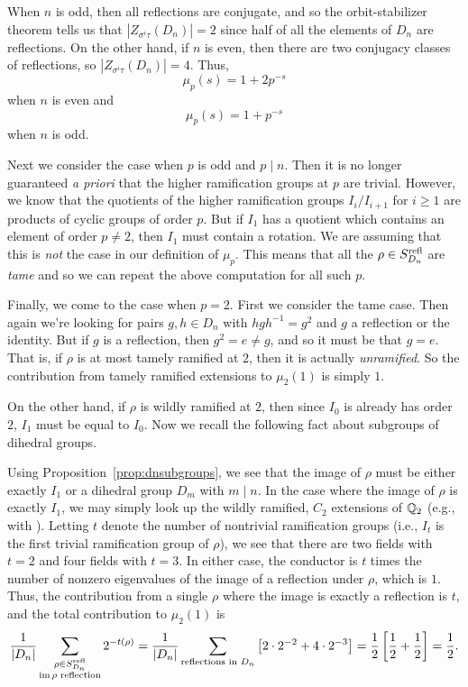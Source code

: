 When $n$ is odd, then all reflections are conjugate, and so the
orbit-stabilizer theorem tells us that $|Z_{\sigma^i\tau}(D_n)| = 2$ since half
of all the elements of $D_n$ are reflections. On the other hand, if $n$ is
even, then there are two conjugacy classes of reflections, so $|Z_{\sigma^i\tau}(D_n)| = 4$. Thus,
\[ \mu_p(s) = 1 + 2p^{-s} \]
when $n$ is even and
\[ \mu_p(s) = 1 + p^{-s} \]
when $n$ is odd.

Next we consider the case when $p$ is odd and $p \mid n$. Then it is no longer
guaranteed {\em a priori} that the higher ramification groups at $p$ are
trivial. However, we know that the quotients of the higher ramification groups
$I_i/I_{i+1}$ for $i \geq 1$ are products of cyclic groups of order $p$. But if
$I_1$ has a quotient which contains an element of order $p \ne 2$, then $I_1$
must contain a rotation. We are assuming that this is {\em not} the case in our
definition of $\mu_p$. This means that all the $\rho \in S_{D_n}^{\mathrm{refl}}$ are
{\em tame} and so we can repeat the above computation for all such $p$.

Finally, we come to the case when $p = 2$. First we consider the tame case.
Then again we're looking for pairs $g, h \in D_n$ with $hgh^{-1} = g^2$ and $g$
a reflection or the identity. But if $g$ is a reflection, then $g^2 = e \ne g$,
and so it must be that $g = e$. That is, if $\rho$ is at most tamely ramified
at $2$, then it is actually {\em unramified}. So the contribution from tamely
ramified extensions to $\mu_2(1)$ is simply $1$.

On the other hand, if $\rho$ is wildly ramified at $2$, then since $I_0$ is
already has order $2$, $I_1$ must be equal to $I_0$. Now we recall the
following fact about subgroups of dihedral groups.

Using Proposition~\ref{prop:dnsubgroups}, we see that the image of $\rho$ must
be either exactly $I_1$ or a dihedral group $D_m$ with $m \mid n$. In the case
where the image of $\rho$ is exactly $I_1$, we may simply look up the wildly
ramified, $C_2$ extensions of $\mathbb{Q}_2$ (e.g., with \cite{LMFDB}). Letting $t$
denote the number of nontrivial ramification groups (i.e., $I_t$ is the first
trivial ramification group of $\rho$), we see that there are two fields with $t
= 2$ and four fields with $t = 3$. In either case, the conductor is $t$ times
the number of nonzero eigenvalues of the image of a reflection under $\rho$,
which is $1$. Thus, the contribution from a single $\rho$ where the image is
exactly a reflection is $t$, and the total contribution to $\mu_2(1)$ is \[
\frac{1}{|D_n|} \sum_{\substack{\rho \in S_{D_n}^{\mathrm{refl}} \\ \operatorname{im} \rho\text{
reflection}}} 2^{-t(\rho)} = \frac{1}{|D_n|} \sum_{\text{reflections in $D_n$}}
\left[ 2 \cdot 2^{-2} + 4 \cdot 2^{-3} \right] = \frac{1}{2} \left[ \frac{1}{2}
+ \frac{1}{2} \right] = \frac{1}{2}. \]

